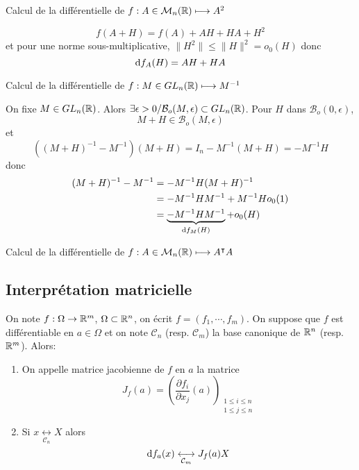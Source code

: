 \begin{ex} Calcul de la différentielle de
    {$f:A\in\mathcal M_n(\mathbb R)\longmapsto A^2$}
\end{ex}

\[
    f(A+H)=f(A)+AH+HA+H^2
\]
et pour une norme sous-multiplicative, $\|H^2\|\leq \|H\|^2=o_0(H)$ donc \[
    \mathrm{d} f_A(H)=AH+HA
\]

\begin{ex} Calcul de la différentielle de
    {$f:M\in GL_n(\mathbb R)\longmapsto M^{-1}$}
\end{ex}

On fixe $M\in GL_n(\mathbb R)$. Alors $\exists \epsilon >0 / \mathcal B_o(M, \epsilon)\subset GL_n(\mathbb R)$. Pour $H$ dans $\mathcal B_o(0, \epsilon)$, \[
    M+H\in\mathcal B_o(M, \epsilon)
\]
et \[
    \left((M+H)^{-1}-M^{-1}\right)(M+H)=I_n-M^{-1}(M+H)=-M^{-1}H
\] donc
\begin{align*}
    (M+H)^{-1}-M^{-1}&=-M^{-1}H(M+H)^{-1}\\&=-M^{-1}HM^{-1}+M^{-1}Ho_0(1)\\&=\underbrace{-M^{-1}HM^{-1}}_{\mathrm{d} f_M(H)}+o_0(H)
\end{align*}

\begin{exo} Calcul de la différentielle de
    {$f:A\in\mathcal M_n(\mathbb R)\longmapsto A^\intercal A$}
\end{exo}

\subsection{Interprétation matricielle}

\begin{thmdef}
    On note $f:\Omega\to \mathbb R^m$, $\Omega\subset \mathbb R^n$, on écrit $f=(f_1, \cdots, f_m)$. On suppose que $f$ est différentiable en $a\in\Omega$ et on note $\mathcal C_n$ (resp. $\mathcal C_m$) la base canonique de $\mathbb R^n$ (resp. $\mathbb R^m$). Alors: \begin{enumerate}
        \item On appelle matrice jacobienne de $f$ en $a$ la matrice \[
                J_f(a)=\left(\frac{\partial f_i}{\partial x_j}(a)\right)_{\substack{1\leq i\leq n\\ 1\leq j\leq n}}
            \]
        \item Si $x\underset{\mathcal C_n}{\longleftrightarrow}X$ alors \[
                \mathrm{d} f_a(x)\underset{\mathcal C_m}\longleftrightarrow J_f(a)X
            \]
    \end{enumerate}
\end{thmdef}

